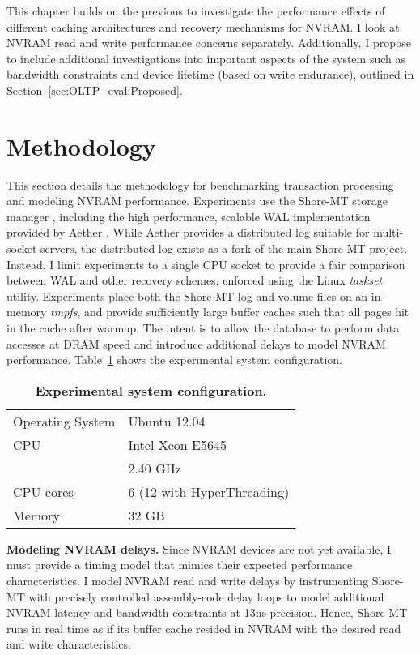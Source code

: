 This chapter builds on the previous to investigate the performance effects of different caching architectures and recovery mechanisms for NVRAM.
I look at NVRAM read and write performance concerns separately.
Additionally, I propose to include additional investigations into important aspects of the system such as bandwidth constraints and device lifetime (based on write endurance), outlined in Section~\ref{sec:OLTP_eval:Proposed}.

\section{Methodology}
\label{sec:OLTP_design:Methodology}

This section details the methodology for benchmarking transaction processing and modeling NVRAM performance.
Experiments use the Shore-MT storage manager \cite{JohnsonPandis09}, including the high performance, scalable WAL implementation provided by Aether \cite{JohnsonPandis10}.
While Aether provides a distributed log suitable for multi-socket servers, the distributed log exists as a fork of the main Shore-MT project.
Instead, I limit experiments to a single CPU socket to provide a fair comparison between WAL and other recovery schemes, enforced using the Linux \emph{taskset} utility.
Experiments place both the Shore-MT log and volume files on an in-memory \emph{tmpfs}, and provide sufficiently large buffer caches such that all pages hit in the cache after warmup.
The intent is to allow the database to perform data accesses at DRAM speed and introduce additional delays to model NVRAM performance.
Table~\ref{table::Specs} shows the experimental system configuration.

\begin{table}
  \centering
  \begin{tabular}{l l}
    \hline
    Operating System & Ubuntu 12.04 \\
    CPU & Intel Xeon E5645 \\
    & 2.40 GHz \\
    CPU cores & 6 (12 with HyperThreading) \\
    Memory & 32 GB \\
    \hline
  \end{tabular}
  \caption{\textbf{Experimental system configuration.}}
  \label{table::Specs}
\end{table}

\textbf{Modeling NVRAM delays.}
Since NVRAM devices are not yet available, I must provide a timing model that mimics their expected performance characteristics.
I model NVRAM read and write delays by instrumenting Shore-MT with precisely controlled assembly-code delay loops to model additional NVRAM latency and bandwidth constraints at 13ns precision.
Hence, Shore-MT runs in real time as if its buffer cache resided in NVRAM with the desired read and write characteristics.

